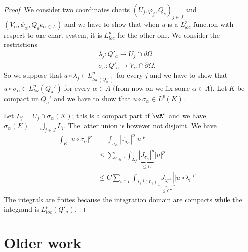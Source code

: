 \begin{proof}
	We consider two coordinates charts \( (U_j,\varphi_j,Q_a)_{j\in J}\) and \( (V_{\alpha},\psi_{\alpha},Q_aa_{\alpha\in A})\) and we have to show that when \( u\) is a \( L^p_{loc} \) function with respect to one chart system, it is \( L^p_{loc}\) for the other one. We consider the restrictions
	\begin{subequations}
		\begin{align}
			\lambda_j\colon Q'_a\to U_j\cap \partial\Omega \\
			\sigma_{\alpha}\colon Q'_a\to V_{\alpha}\cap\partial\Omega.
		\end{align}
	\end{subequations}
	So we suppose that \( u\circ\lambda_j\in L^p_{loc(Q_a')} \) for every \( j\) and we have to show that \( u\circ\sigma_{\alpha}\in L^p_{loc}(Q_a')\) for every \( \alpha\in A\) (from now on we fix some \( \alpha\in A\)). Let \( K\) be compact un \( Q_a'\) and we have to show that \( u\circ\sigma_{\alpha}\in L^p(K)\).

	Let \( L_j=U_j\cap\sigma_{\alpha}(K)\); this is a compact part of \( \eR^d\) and we have \( \sigma_{\alpha}(K)=\bigcup_{j\in J}L_j\). The latter union is however not disjoint. We have
	\begin{subequations}
		\begin{align}
			\int_K| u\circ\sigma_{\alpha} |^p & =\int_{\sigma_{\alpha}}| J_{\sigma_{\alpha}} |^p| u |^p                                                         \\
			                                  & \leq \sum_{i\in I}\int_{L_j}\underbrace{| J_{\sigma_{\alpha}} |^p}_{\leq C}| u |^p                              \\
			                                  & \leq C\sum_{i\in I}\int_{\lambda_i^{-1}(L_i)}\underbrace{| J_{\lambda_i^{-1}} |}_{\leq C'} |u\circ\lambda_i |^p
		\end{align}
	\end{subequations}
	The integrals are finites because the integration domain are compacts while the integrand is \( L^p_{loc}(Q'_a)\).
\end{proof}

\section{Older work}
\label{SECooNJLDooFcUzQv}


